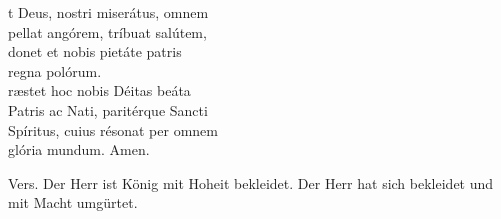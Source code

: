 \vspace{0.2cm}



\def\greinitialformat#1{{\fontsize{40}{40}\selectfont #1}}
\gresetfirstlineaboveinitial{\small \textcolor{red}{æstate}}{}
\setaboveinitialseparation{0.72mm}

\vspace{0.2cm}
\begin{centering}


t Deus, nostri miserátus, omnem\\
pellat angórem, tríbuat salútem, \\
donet et nobis pietáte patris\\
	regna polórum.\\
	
	
ræstet hoc nobis Déitas beáta\\
Patris ac Nati, paritérque Sancti\\
Spíritus, cuius résonat per omnem\\
	glória mundum. Amen.


\end{centering}

\vspace{0.2cm}


Vers. Der Herr ist König mit Hoheit bekleidet. Der Herr hat sich bekleidet und mit Macht umgürtet.



